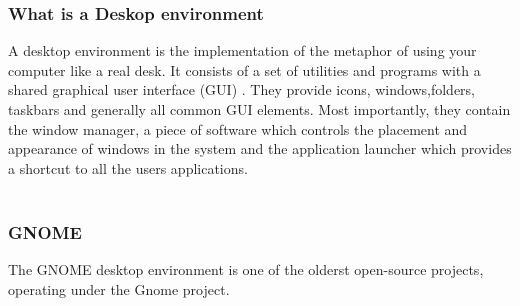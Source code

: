 \documentclass[a4paper]{article}
\begin{document}
\subsubsection{What is a Deskop environment}
A desktop environment is the implementation of the metaphor of using your computer like a real desk. It consists of a set of utilities and programs with a shared graphical user interface (GUI) . They provide icons, windows,folders, taskbars and generally all common GUI elements. Most importantly, they contain the window manager, a piece of software which controls the placement and appearance of windows in the system and the application launcher which provides a shortcut to all the users applications. \\ \\
\subsubsection{GNOME}
The GNOME desktop environment is one of the olderst open-source projects, operating under the Gnome project\cite{Gnome}.  
\end{document}
